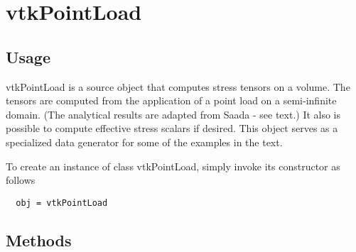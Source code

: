 \section{vtkPointLoad}

\subsection{Usage}

 vtkPointLoad is a source object that computes stress tensors on a volume. 
 The tensors are computed from the application of a point load on a 
 semi-infinite domain. (The analytical results are adapted from Saada - see 
 text.) It also is possible to compute effective stress scalars if desired.
 This object serves as a specialized data generator for some of the examples
 in the text.

To create an instance of class vtkPointLoad, simply
invoke its constructor as follows
\begin{verbatim}
  obj = vtkPointLoad
\end{verbatim}
\subsection{Methods}

